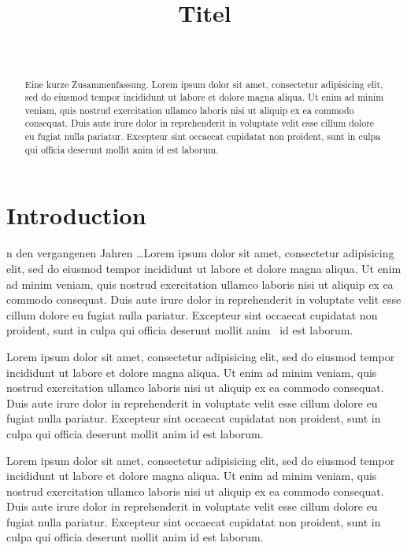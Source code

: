 \documentclass[10pt,a4paper,compsoc]{IEEEtran}
\begin{document}
\title{Titel}

\author{%
\\
%
}


\maketitle

\begin{abstract}
Eine kurze Zusammenfassung. Lorem ipsum dolor sit amet, consectetur adipisicing elit, sed do eiusmod tempor incididunt ut labore et dolore magna aliqua. Ut enim ad minim veniam, quis nostrud exercitation ullamco laboris nisi ut aliquip ex ea commodo consequat. Duis aute irure dolor in reprehenderit in voluptate velit esse cillum dolore eu fugiat nulla pariatur. Excepteur sint occaecat cupidatat non proident, sunt in culpa qui officia deserunt mollit anim id est laborum.
\end{abstract}

\section{Introduction}
n den vergangenen Jahren \dots Lorem ipsum dolor sit amet, consectetur adipisicing elit, sed do eiusmod tempor incididunt ut labore et dolore magna aliqua. Ut enim ad minim veniam, quis nostrud exercitation ullamco laboris nisi ut aliquip ex ea commodo consequat. Duis aute irure dolor in reprehenderit in voluptate velit esse cillum dolore eu fugiat nulla pariatur. Excepteur sint occaecat cupidatat non proident, sunt in culpa qui officia deserunt mollit anim~\cite{test} id est laborum.

Lorem ipsum dolor sit amet, consectetur adipisicing elit, sed do eiusmod tempor incididunt ut labore et dolore magna aliqua. Ut enim ad minim veniam, quis nostrud exercitation ullamco laboris nisi ut aliquip ex ea commodo consequat. Duis aute irure dolor in reprehenderit in voluptate velit esse cillum dolore eu fugiat nulla pariatur. Excepteur sint occaecat cupidatat non proident, sunt in culpa qui officia deserunt mollit anim id est laborum.

Lorem ipsum dolor sit amet, consectetur adipisicing elit, sed do eiusmod tempor incididunt ut labore et dolore magna aliqua. Ut enim ad minim veniam, quis nostrud exercitation ullamco laboris nisi ut aliquip ex ea commodo consequat. Duis aute irure dolor in reprehenderit in voluptate velit esse cillum dolore eu fugiat nulla pariatur. Excepteur sint occaecat cupidatat non proident, sunt in culpa qui officia deserunt mollit anim id est laborum.
\end{document}
